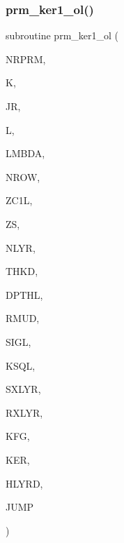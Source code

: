\subsubsection{\texorpdfstring{prm\+\_\+ker1\+\_\+ol()}{prm\_ker1\_ol()}}
{\footnotesize\ttfamily subroutine prm\+\_\+ker1\+\_\+ol (\begin{DoxyParamCaption}\item[{integer}]{N\+R\+P\+RM,  }\item[{integer}]{K,  }\item[{integer}]{JR,  }\item[{integer}]{L,  }\item[{real(kind=ql)}]{L\+M\+B\+DA,  }\item[{integer}]{N\+R\+OW,  }\item[{real, dimension(nrow)}]{Z\+C1L,  }\item[{real(kind=ql)}]{ZS,  }\item[{integer}]{N\+L\+YR,  }\item[{real(kind=ql), dimension (nlyr)}]{T\+H\+KD,  }\item[{real(kind=ql), dimension (nlyr)}]{D\+P\+T\+HL,  }\item[{real(kind=ql), dimension(0\+:nlyr)}]{R\+M\+UD,  }\item[{complex(kind=ql), dimension (nlyr)}]{S\+I\+GL,  }\item[{complex(kind=ql), dimension (nlyr)}]{K\+S\+QL,  }\item[{integer}]{S\+X\+L\+YR,  }\item[{integer}]{R\+X\+L\+YR,  }\item[{integer}]{K\+FG,  }\item[{complex (kind=ql), dimension(jnlo-\/nrprm\+:jnhi,3,nrow)}]{K\+ER,  }\item[{complex (kind=ql), dimension(nrprm,3,nrow)}]{H\+L\+Y\+RD,  }\item[{logical}]{J\+U\+MP }\end{DoxyParamCaption})}

